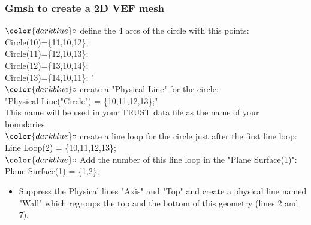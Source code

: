 \documentclass[10pt]{beamer}
\begin{document}
\begin{frame}
\frametitle{Gmsh to create a 2D VEF mesh}
\begin{block}{}

\hspace{1cm} $\color{darkblue}\circ$ {\small{ define the 4 arcs of the circle with this points: \\
\hspace{1.4cm} Circle(10)=\{11,10,12\};\\
\hspace{1.4cm} Circle(11)=\{12,10,13\};\\
\hspace{1.4cm} Circle(12)=\{13,10,14\};\\
\hspace{1.4cm} Circle(13)=\{14,10,11\}; "}}\\
\hspace{1cm} $\color{darkblue}\circ$ {\small{ create a "Physical Line" for the circle: \\
\hspace{1.4cm} "Physical Line("Circle") = \{10,11,12,13\};"\\
\hspace{1.4cm} This name will be used in your TRUST data file as the name of your \\
\hspace{1.4cm} boundaries.}}\\
\hspace{1cm} $\color{darkblue}\circ$ {\small{create a line loop for the circle just after the first line loop:\\
\hspace{1.4cm} Line Loop(2) = \{10,11,12,13\}; \\}}
\hspace{1cm} $\color{darkblue}\circ$ {\small{Add the number of this line loop in the "Plane Surface(1)":\\
\hspace{1.4cm} Plane Surface(1) = \{1,2\}; }}


\begin{itemize}
\item Suppress the Physical lines "Axis" and "Top" and create a physical line named "Wall" which regroups the top and the bottom of this geometry (lines 2 and 7).
\end{itemize}

\end{block}
\end{frame}
\end{document}

